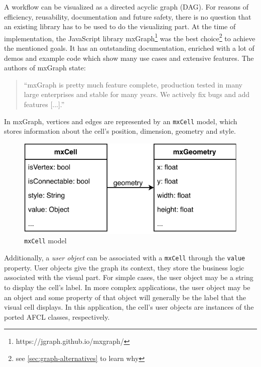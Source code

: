 \documentclass[a4paper,12pt,pdftex,halfparskip,cleardoubleempty,bibtotoc,liststotoc]{scrbook}
\begin{document}
A workflow can be visualized as a directed acyclic graph (DAG). For reasons of efficiency, reusability, documentation and future safety, there is no question that an existing library has to be used to do the visualizing part.
At the time of implementation, the JavaScript library mxGraph\footnote{https://jgraph.github.io/mxgraph/} was the best choice\footnote{see \ref{sec:graph-alternatives} to learn why} to achieve the mentioned goals.
It has an outstanding documentation, enriched with a lot of demos and example code which show many use cases and extensive features. The authors of mxGraph state:\\
\begin{quote}
``mxGraph is pretty much feature complete, production tested in many large enterprises and stable for many years. We actively fix bugs and add features [...].''
\end{quote}

In mxGraph, vertices and edges are represented by an \texttt{mxCell} model, which stores information about the cell's position, dimension, geometry and style.

\begin{figure}[H]
  \centering
  \vspace{0.8cm}
  \includegraphics[]{mxCell}
  \caption{\texttt{mxCell} model}
\end{figure}

Additionally, a \textit{user object} can be associated with a \texttt{mxCell} through the \texttt{value} property. User objects give the graph its context, they store the business logic associated with the visual part. \cite{manuals-mxgraph-user-manual} For simple cases, the user object may be a string to display the cell's label. In more complex applications, the user object may be an object and some property of that object will generally be the label that the visual cell displays. In this application, the cell's user objects are instances of the ported AFCL classes, respectively.
\end{document}
